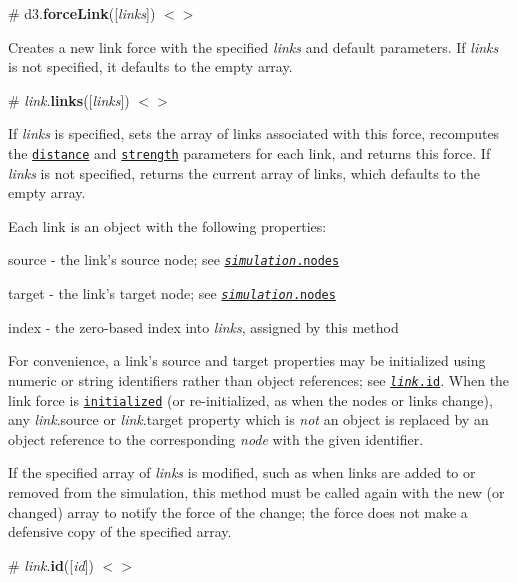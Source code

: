 \label{_forceLink}%
\# d3.{\bfseries force\+Link}(\mbox{[}{\itshape links}\mbox{]}) \href{https://github.com/d3/d3-force/blob/master/src/link.js}{\tt $<$$>$}

Creates a new link force with the specified {\itshape links} and default parameters. If {\itshape links} is not specified, it defaults to the empty array.

\label{_link_links}%
\# {\itshape link}.{\bfseries links}(\mbox{[}{\itshape links}\mbox{]}) \href{https://github.com/d3/d3-force/blob/master/src/link.js#L92}{\tt $<$$>$}

If {\itshape links} is specified, sets the array of links associated with this force, recomputes the \href{#link_distance}{\tt distance} and \href{#link_strength}{\tt strength} parameters for each link, and returns this force. If {\itshape links} is not specified, returns the current array of links, which defaults to the empty array.

Each link is an object with the following properties\+:


\begin{DoxyItemize}
\item {\ttfamily source} -\/ the link’s source node; see \href{#simulation_nodes}{\tt {\itshape simulation}.nodes}
\item {\ttfamily target} -\/ the link’s target node; see \href{#simulation_nodes}{\tt {\itshape simulation}.nodes}
\item {\ttfamily index} -\/ the zero-\/based index into {\itshape links}, assigned by this method
\end{DoxyItemize}

For convenience, a link’s source and target properties may be initialized using numeric or string identifiers rather than object references; see \href{#link_id}{\tt {\itshape link}.id}. When the link force is \href{#force_initialize}{\tt initialized} (or re-\/initialized, as when the nodes or links change), any {\itshape link}.source or {\itshape link}.target property which is {\itshape not} an object is replaced by an object reference to the corresponding {\itshape node} with the given identifier.

If the specified array of {\itshape links} is modified, such as when links are added to or removed from the simulation, this method must be called again with the new (or changed) array to notify the force of the change; the force does not make a defensive copy of the specified array.

\label{_link_id}%
\# {\itshape link}.{\bfseries id}(\mbox{[}{\itshape id}\mbox{]}) \href{https://github.com/d3/d3-force/blob/master/src/link.js#L96}{\tt $<$$>$}

